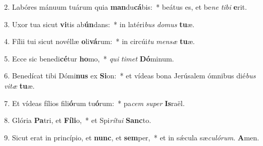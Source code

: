2. Labóres mánuum tuárum quia \textbf{man}du\textbf{cá}bis:~*  beátus es, et be\textit{ne} \textit{ti}\textit{bi} \textbf{e}rit.\

3. Uxor tua sicut \textbf{vi}tis ab\textbf{ún}dans:~*  in latéri\textit{bus} \textit{do}\textit{mus} \textbf{tu}æ.\

4. Fílii tui sicut novéllæ \textbf{o}li\textbf{vá}rum:~*  in circúi\textit{tu} \textit{men}\textit{sæ} \textbf{tu}æ.\

5. Ecce sic benedi\textbf{cé}tur \textbf{ho}mo,~*  \textit{qui} \textit{ti}\textit{met} \textbf{Dó}minum.\

6. Benedícat tibi Dómi\textbf{nus} ex \textbf{Si}on:~*  et vídeas bona Jerúsalem ómnibus dié\textit{bus} \textit{vi}\textit{tæ} \textbf{tu}æ.\

7. Et vídeas fílios fili\textbf{ó}rum tu\textbf{ó}rum:~*  pa\textit{cem} \textit{su}\textit{per} \textbf{Is}raël.\

8. Glória \textbf{Pa}tri, et \textbf{Fí}\textbf{li}o,~*  et Spi\textit{rí}\textit{tu}\textit{i} \textbf{Sanc}to.\

9. Sicut erat in princípio, et \textbf{nunc}, et \textbf{sem}per,~*  et in sǽcula sæ\textit{cu}\textit{ló}\textit{rum}. \textbf{A}men.\

